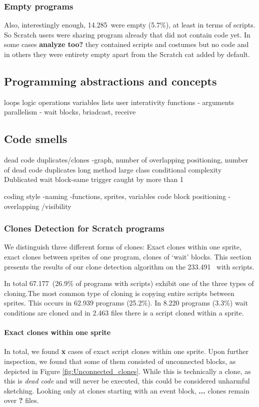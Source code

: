 \documentclass{sig-alternate}
\newcommand{\nemptyPrograms}{14.285}
\newcommand{\nScriptPrograms}{233.491}
\newcommand{\nProgramsWithClones}{67.177}
\newcommand{\todo}[1]{\textbf{#1}}
\begin{document}
\subsubsection{Empty programs}

Also, interestingly enough, \nemptyPrograms~were empty (5.7\%), at least in terms of scripts. So Scratch users were sharing program already that did not contain code yet. In some cases \todo{analyze too?} they contained scripts and costumes but no code and in others they were entirety empty apart from the Scratch cat added by default.

\subsection{Programming abstractions and concepts}
loops	
logic operations	
variables	
lists	
user interativity	
functions - arguments
parallelism	- wait blocks, briadcast, receive	


\subsection{Code smells}
dead code
duplicates/clones -graph, number of overlapping positioning, number of dead code duplicates
long method
large class
conditional complexity
Dublicated wait block-same trigger caught by more than 1

coding style -naming -functions, sprites, variables
code block positioning - overlapping /visibility

\subsubsection{Clones Detection for Scratch programs}
\label{clone_Detection}

We distinguish three different forms of clones: Exact clones within one sprite, exact clones between sprites of one program, clones of `wait' blocks. This section presents the results of our clone detection algorithm on the \nScriptPrograms~ with scripts.

In total \nProgramsWithClones~(26.9\% of programs with scripts) exhibit one of the three types of cloning.The most common type of cloning is copying entire scripts between sprites. This occurs in 62.939 programs (25.2\%). In 8.220 programs (3.3\%) wait conditions are cloned and in 2.463 files there is a script cloned within a sprite.

\paragraph{Exact clones within one sprite}
In total, we found \todo{x} cases of exact script clones within one sprite. Upon further inspection, we found that some of them consisted of unconnected blocks, as depicted in Figure \ref{fig:Unconnected_clones}. While this is technically a clone, as this is \emph{dead code} and will never be executed, this could be considered unharmful sketching. Looking only at clones starting with an event block, \todo{...} clones remain over \todo{?} files.
\end{document}

